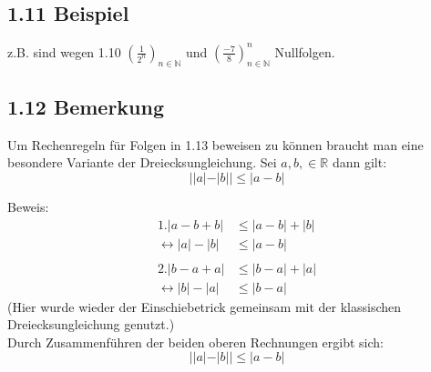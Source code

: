 \documentclass[12pt]{article}
\begin{document}
\subsection*{1.11 Beispiel}
z.B. sind wegen 1.10 $(\frac{1}{2^n})_{n\in \mathbb{N}}$ und $(\frac{-7}{8})_{n\in \mathbb{N}}^n$ Nullfolgen. 

\subsection*{1.12 Bemerkung}
Um Rechenregeln für Folgen in 1.13 beweisen zu können braucht man eine besondere Variante der Dreiecksungleichung. Sei $a,b, \in \mathbb{R}$ dann gilt: 
$$ ||a|-|b|| \leq |a-b|$$

Beweis: \\
\begin{align*}
\text{1.} |a-b+b| &\leq |a-b| + |b|\\
\leftrightarrow |a| - |b| &\leq |a-b|\\
\\
\text{2.} |b-a+a| &\leq  |b-a| + |a|\\
\leftrightarrow |b|-|a| &\leq |b-a|
\end{align*}
(Hier wurde wieder der Einschiebetrick gemeinsam mit der klassischen Dreiecksungleichung genutzt.) \\
Durch Zusammenführen der beiden oberen Rechnungen ergibt sich: 
$$ ||a|-|b|| \leq |a-b|$$
\end{document}
